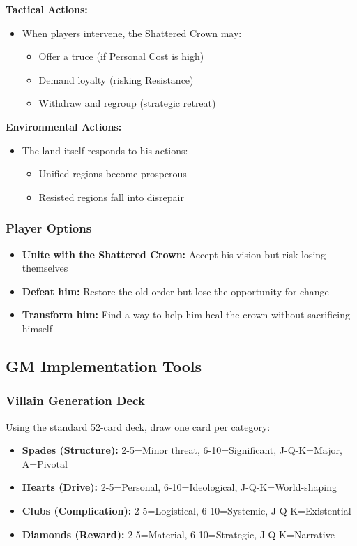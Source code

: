 \documentclass[10pt]{article}
\begin{document}
\textbf{Tactical Actions:}
\begin{itemize}
  \item When players intervene, the Shattered Crown may:
    \begin{itemize}
      \item Offer a truce (if Personal Cost is high)
      \item Demand loyalty (risking Resistance)
      \item Withdraw and regroup (strategic retreat)
    \end{itemize}
\end{itemize}

\textbf{Environmental Actions:}
\begin{itemize}
  \item The land itself responds to his actions:
    \begin{itemize}
      \item Unified regions become prosperous
      \item Resisted regions fall into disrepair
    \end{itemize}
\end{itemize}

\subsubsection{Player Options}

\begin{itemize}
  \item \textbf{Unite with the Shattered Crown:} Accept his vision but risk losing themselves
  \item \textbf{Defeat him:} Restore the old order but lose the opportunity for change
  \item \textbf{Transform him:} Find a way to help him heal the crown without sacrificing himself
\end{itemize}

\subsection{GM Implementation Tools}

\subsubsection{Villain Generation Deck}

Using the standard 52-card deck, draw one card per category:

\begin{itemize}
  \item \textbf{Spades (Structure):} 2-5=Minor threat, 6-10=Significant, J-Q-K=Major, A=Pivotal
  \item \textbf{Hearts (Drive):} 2-5=Personal, 6-10=Ideological, J-Q-K=World-shaping
  \item \textbf{Clubs (Complication):} 2-5=Logistical, 6-10=Systemic, J-Q-K=Existential
  \item \textbf{Diamonds (Reward):} 2-5=Material, 6-10=Strategic, J-Q-K=Narrative
\end{itemize}
\end{document}
